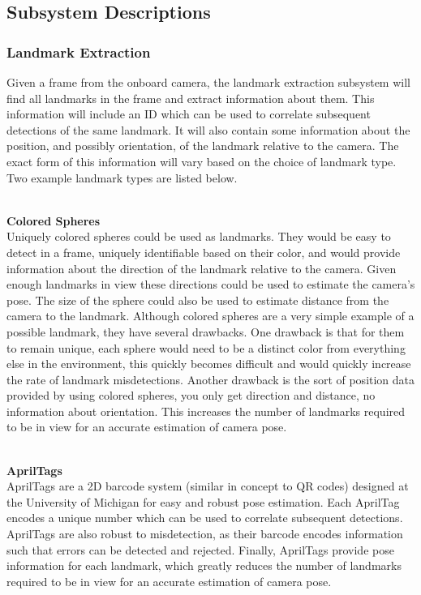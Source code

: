 \documentclass[12pt]{article}
\begin{document}
\subsection{Subsystem Descriptions}

\subsubsection{Landmark Extraction}
Given a frame from the onboard camera, the landmark extraction subsystem will find all landmarks in
the frame and extract information about them. This information will include an ID which can be used
to correlate subsequent detections of the same landmark. It will also contain some information about
the position, and possibly orientation, of the landmark relative to the camera. The exact form of this
information will vary based on the choice of landmark type. Two example landmark types are listed below. 

\ \\
\textbf{Colored Spheres}
\ \\
Uniquely colored spheres could be used as landmarks. They would be easy to detect in a frame, uniquely
identifiable based on their color, and would provide information about the direction of the landmark
relative to the camera. Given enough landmarks in view these directions could be used to estimate the
camera's pose. The size of the sphere could also be used to estimate distance from the camera to the landmark.
\newline\newline
Although colored spheres are a very simple example of a possible landmark, they have several drawbacks. One
drawback is that for them to remain unique, each sphere would need to be a distinct color from everything else
in the environment, this quickly becomes difficult and would quickly increase the rate of landmark misdetections.
\newline\newline
Another drawback is the sort of position data provided by using colored spheres, you only get direction and
distance, no information about orientation. This increases the number of landmarks required to be in view for
an accurate estimation of camera pose. 

\ \\
\textbf{AprilTags \cite{olson2011tags}}
\ \\
AprilTags are a 2D barcode system (similar in concept to QR codes) designed at the University of Michigan for
easy and robust pose estimation.
\newline\newline
Each AprilTag encodes a unique number which can be used to correlate subsequent detections. AprilTags are also
robust to misdetection, as their barcode encodes information such that errors can be detected and rejected. Finally,
AprilTags provide pose information for each landmark, which greatly reduces the number of landmarks required to be
in view for an accurate estimation of camera pose.
\end{document}
